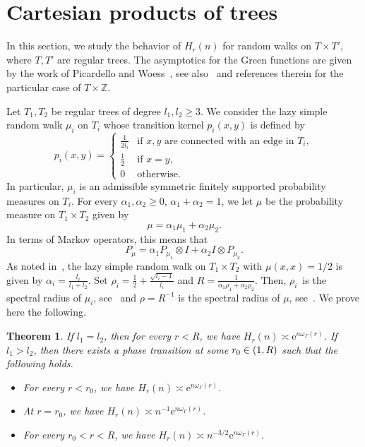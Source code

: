 \documentclass[10pt]{amsart}
\newtheorem{theo}{Theorem}[section]
\theoremstyle{definition}\newtheorem{defi}[theo]{Definition}\newtheorem{rema}[theo]{Remark}\newtheorem{exam}[theo]{Example}\newtheorem{exem}[theo]{Example}\newtheorem{nota}[theo]{Notation}
\newcommand{\Z}{\mathbb{Z}}
\newcommand{\rme}{\mathrm{e}}
\let\oldin\in
\renewcommand{\in}{\mathchoice{\oldin}{\oldin}{\,\oldin\,}{\,\oldin\,}}
\begin{document}
\section{Cartesian products of trees}\label{Sectionbitree}
In this section, we study the behavior of $H_r(n)$ for random walks on $T\times T'$, where $T,T'$ are regular trees. The asymptotics for the Green functions are given by the work of Picardello and Woess~\cite{PicardelloWoessbitree}, see also~\cite[Section~28]{Woessbook} and references therein for the particular case of $T\times \Z$.

Let $T_1,T_2$ be regular trees of degree $l_1,l_2\geq 3$. We consider the lazy simple random walk $\mu_i$ on $T_i$ whose transition kernel $p_i(x,y)$ is defined by
\[
p_i(x,y)=
\begin{cases}
\frac{1}{2l_i} &\text{if } x,y \text{ are connected with an edge in } T_i,\\
\frac{1}{2} &\text{if }x=y,\\
0 &\text{otherwise.}
\end{cases}
\]
In particular, $\mu_i$ is an admissible symmetric finitely supported probability measures on $T_i$. For every $\alpha_1,\alpha_2\geq 0$, $\alpha_1+\alpha_2=1$, we let $\mu$ be the probability measure on $T_1\times T_2$ given by
\begin{equation}\label{defmubitree}
\mu=\alpha_1 \mu_1+\alpha_2\mu_2.
\end{equation}
In terms of Markov operators, this means that
\[
P_{\mu}=\alpha_1 P_{\mu_1}\otimes I+\alpha_2 I\otimes P_{\mu_2}.
\]
As noted in~\cite[Section~3]{PicardelloWoessbitree}, the lazy simple random walk on $T_1\times T_2$ with $\mu(x,x)=1/2$ is given by $\alpha_i=\frac{l_i}{l_1+l_2}$. Set $\rho_i = \frac{1}{2} + \frac{\sqrt{l_i - 1}}{l_i}$ and $R = \frac{1}{\alpha_1 \rho_1 + \alpha_2 \rho_2}$. Then, $\rho_i$~is the spectral radius of $\mu_i$, see~\cite[(2.2)]{PicardelloWoessbitree} and $\rho=R^{-1}$ is the spectral radius of $\mu$, see~\cite[Section~3]{PicardelloWoessbitree}. We prove here the following.
\begin{theo}\label{thmbitree}
If $l_1=l_2$, then for every $r<R$, we have $H_r(n)\asymp \rme^{n\omega_\Gamma(r)}$. If $l_1>l_2$, then there exists a phase transition at some $r_0\in (1,R)$ such that the following holds.
\begin{itemize}
\item For every $r<r_0$, we have $H_r(n)\asymp \rme^{n\omega_\Gamma(r)}$.
\item At $r=r_0$, we have $H_r(n)\asymp n^{-1}\rme^{n\omega_\Gamma(r)}$.
\item For every $r_0<r<R$, we have $H_r(n)\asymp n^{-3/2}\rme^{n\omega_\Gamma(r)}$.
\end{itemize}
\end{theo}
\end{document}
